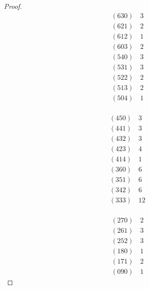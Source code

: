 \documentclass[12pt]{amsart}
\theoremstyle{definition}
\theoremstyle{remark}
\theoremstyle{definition}
\begin{document}
\begin{proof}
     \begin{minipage}[t]{.30\textwidth}
     \begin{align*}
        (630) & \, 3 \\
        (621) & \, 2 \\
        (612) & \, 1 \\
        (603) & \, 2 \\
        (540) & \, 3 \\
        (531) & \, 3 \\
        (522) & \, 2 \\
        (513) & \, 2 \\
        (504) & \, 1 \\
     \end{align*}    
     \end{minipage}
     \begin{minipage}[t]{.30\textwidth}
       \begin{align*}
        (450) & \, 3 \\
        (441) & \, 3 \\
        (432) & \, 3\\
        (423) & \, 4\\
        (414) & \, 1\\
        (360) & \, 6\\
        (351) & \, 6\\
        (342) & \, 6 \\
        (333) & \, 12\\
        \end{align*}
        \end{minipage}
        \begin{minipage}[t]{.30\textwidth}
        \begin{align*}
        (270) & \, 2\\
        (261) & \, 3\\
        (252) & \, 3\\
        (180) & \, 1\\
        (171) & \, 2\\
        (090) & \, 1
    \end{align*}
    \end{minipage}
       

\end{proof}
\end{document}
